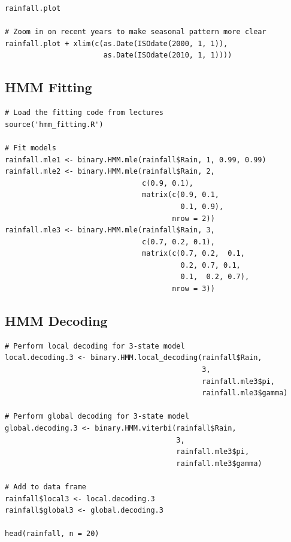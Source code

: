 \documentclass{article}
\begin{document}
\begin{appendices}
\begin{verbatim}
rainfall.plot

# Zoom in on recent years to make seasonal pattern more clear
rainfall.plot + xlim(c(as.Date(ISOdate(2000, 1, 1)),
                       as.Date(ISOdate(2010, 1, 1))))
\end{verbatim}

\subsection{HMM Fitting}\label{apdx:hmm_fitting}

\begin{verbatim}
# Load the fitting code from lectures
source('hmm_fitting.R')

# Fit models
rainfall.mle1 <- binary.HMM.mle(rainfall$Rain, 1, 0.99, 0.99)
rainfall.mle2 <- binary.HMM.mle(rainfall$Rain, 2,
                                c(0.9, 0.1),
                                matrix(c(0.9, 0.1,
                                         0.1, 0.9),
                                       nrow = 2))
rainfall.mle3 <- binary.HMM.mle(rainfall$Rain, 3,
                                c(0.7, 0.2, 0.1),
                                matrix(c(0.7, 0.2,  0.1,
                                         0.2, 0.7, 0.1,
                                         0.1,  0.2, 0.7),
                                       nrow = 3))
\end{verbatim}

\subsection{HMM Decoding}\label{apdx:hmm_decoding}

\begin{verbatim}
# Perform local decoding for 3-state model
local.decoding.3 <- binary.HMM.local_decoding(rainfall$Rain,
                                              3,
                                              rainfall.mle3$pi,
                                              rainfall.mle3$gamma)

# Perform global decoding for 3-state model
global.decoding.3 <- binary.HMM.viterbi(rainfall$Rain,
                                        3,
                                        rainfall.mle3$pi,
                                        rainfall.mle3$gamma)

# Add to data frame
rainfall$local3 <- local.decoding.3
rainfall$global3 <- global.decoding.3

head(rainfall, n = 20)


\end{verbatim}
\end{appendices}
\end{document}
